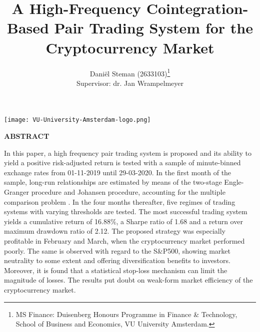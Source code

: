\documentclass[12pt,english,authoryear]{article}
\begin{document}
\onehalfspacing      %
\renewcommand{\footnote}{\endnote}  %


\renewcommand{\thetable}{\arabic{table}}

\author{Daniël Steman (2633103)\thanks{\rm MS Finance: Duisenberg Honours Programme in Finance \& Technology, School of Business and Economics, VU University Amsterdam.}\\[1cm]{\small Supervisor: dr. Jan Wrampelmeyer}}

\title{\Large \bf A High-Frequency Cointegration-Based Pair Trading System for the Cryptocurrency Market}


\maketitle
\thispagestyle{empty}

\medskip

\begin{center}
\texttt{[image: VU-University-Amsterdam-logo.png]}
\end{center}

\medskip


\clearpage

\centerline{\bf ABSTRACT}

\begin{doublespace}  %
  \noindent In this paper, a high frequency pair trading system is proposed and its ability to yield a positive risk-adjusted return is tested with a sample of minute-binned exchange rates from 01-11-2019 until 29-03-2020. In the first month of the sample, long-run relationships are estimated by means of the two-stage Engle-Granger procedure and Johansen procedure, accounting for the multiple comparison problem \cite{Engle_1987, Johansen_1988, Seong_2009}. In the four months thereafter, five regimes of trading systems with varying thresholds are tested. The most successful trading system yields a cumulative return of 16.88\%, a Sharpe ratio of 1.68 and a return over maximum drawdown ratio of 2.12. The proposed strategy was especially profitable in February and March, when the cryptocurrency market performed poorly. The same is observed with regard to the S\&P500, showing market neutrality to some extent and offering diversification benefits to investors. Moreover, it is found that a statistical stop-loss mechanism can limit the magnitude of losses. The results put doubt on weak-form market efficiency of the cryptocurrency market. 
  
\end{doublespace}
\end{document}
